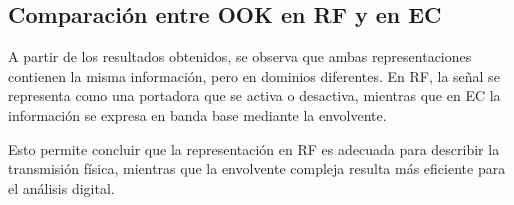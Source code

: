 \subsection{Comparación entre OOK en RF y en EC}

A partir de los resultados obtenidos, se observa que ambas representaciones contienen la misma información, pero en dominios diferentes. En RF, la señal se representa como una portadora que se activa o desactiva, mientras que en EC la información se expresa en banda base mediante la envolvente.

Esto permite concluir que la representación en RF es adecuada para describir la transmisión física, mientras que la envolvente compleja resulta más eficiente para el análisis digital.




